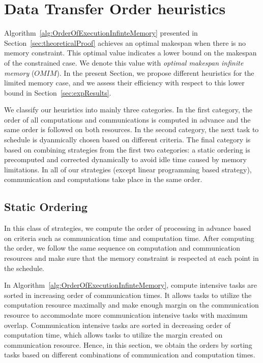 \documentclass[runningheads]{llncs} %
\begin{document}
\section{Data Transfer Order heuristics}
\label{sec:heuristics}

Algorithm~\ref{alg:OrderOfExecutionInfinteMemory} presented in Section~\ref{sec:theoreticalProof} achieves an optimal makespan when there is no memory constraint. This optimal value indicates a lower bound on the makespan of the constrained case. We denote this value with \textit{optimal makespan infinite memory} ($OMIM$). In the present Section, we propose different heuristics for the limited memory case, and we assess their efficiency with respect to this lower bound in Section~\ref{sec:expResults}.


We classify our heuristics into mainly three categories. In the first category, the order of all computations and communications is computed in advance and the same order is followed on both resources. In the second category, the next task to schedule is dyanmically chosen based on different criteria. The final category is based on combining strategies from the first two categories: a static ordering is precomputed and corrected dynamically to avoid idle time caused by memory limitations. In all of our strategies (except linear programming based strategy), communication and computations take place in the same order.

\subsection{Static Ordering}
	In this class of strategies, we compute the order of processing in advance based on criteria such as communication time and computation time. After computing the order, we follow the same sequence on computation and communication resources and make sure that the memory constraint is respected at each point in the schedule.

In Algorithm~\ref{alg:OrderOfExecutionInfinteMemory}, compute intensive tasks are sorted in increasing order of communication times. It allows tasks to utilize the computation resource maximally and make enough margin on the communication resource to accommodate more communication intensive tasks with maximum overlap. Communication intensive tasks are sorted in decreasing order of computation time, which allows tasks to utilize the margin created on communication resource. Hence, in this section, we obtain the orders by sorting tasks based on different combinations of communication and computation times.
\end{document}
